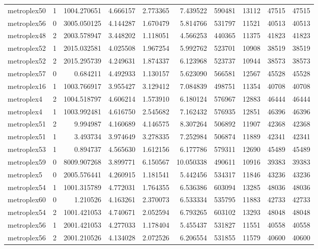 \begin{longtable}{|l|r|r|r|r|r|r|r|r|r|}
metroplex50 & 1 & 1004.270651 & 4.666157 & 2.773365 & 7.439522 & 590481 & 13112 & 47515 & 47515 \\
metroplex56 & 0 & 3005.050125 & 4.144287 & 1.670479 & 5.814766 & 531797 & 11521 & 40513 & 40513 \\
metroplex48 & 2 & 2003.578947 & 3.448202 & 1.118051 & 4.566253 & 440365 & 11375 & 41823 & 41823 \\
metroplex52 & 1 & 2015.032581 & 4.025508 & 1.967254 & 5.992762 & 523701 & 10908 & 38519 & 38519 \\
metroplex52 & 2 & 2015.295739 & 4.249631 & 1.874337 & 6.123968 & 523737 & 10944 & 38573 & 38573 \\
metroplex57 & 0 & 0.684211 & 4.492933 & 1.130157 & 5.623090 & 566581 & 12567 & 45528 & 45528 \\
metroplex16 & 1 & 1003.766917 & 3.955427 & 3.129412 & 7.084839 & 498751 & 11354 & 40708 & 40708 \\
metroplex4 & 2 & 1004.518797 & 4.606214 & 1.573910 & 6.180124 & 576967 & 12883 & 46444 & 46444 \\
metroplex4 & 1 & 1003.992481 & 4.616750 & 2.545682 & 7.162432 & 576935 & 12851 & 46396 & 46396 \\
metroplex51 & 2 & 9.994987 & 4.160689 & 4.146575 & 8.307264 & 506892 & 11907 & 42368 & 42368 \\
metroplex51 & 1 & 3.493734 & 3.974649 & 3.278335 & 7.252984 & 506874 & 11889 & 42341 & 42341 \\
metroplex53 & 1 & 0.894737 & 4.565630 & 1.612156 & 6.177786 & 579311 & 12690 & 45489 & 45489 \\
metroplex59 & 0 & 8009.907268 & 3.899771 & 6.150567 & 10.050338 & 490611 & 10916 & 39383 & 39383 \\
metroplex5 & 0 & 2005.576441 & 4.260915 & 1.181541 & 5.442456 & 534317 & 11846 & 43236 & 43236 \\
metroplex54 & 1 & 1001.315789 & 4.772031 & 1.764355 & 6.536386 & 603094 & 13285 & 48036 & 48036 \\
metroplex60 & 0 & 1.210526 & 4.163261 & 2.370073 & 6.533334 & 535795 & 11883 & 42733 & 42733 \\
metroplex54 & 2 & 1001.421053 & 4.740671 & 2.052594 & 6.793265 & 603102 & 13293 & 48048 & 48048 \\
metroplex56 & 1 & 2001.421053 & 4.277033 & 1.178404 & 5.455437 & 531827 & 11551 & 40558 & 40558 \\
metroplex56 & 2 & 2001.210526 & 4.134028 & 2.072526 & 6.206554 & 531855 & 11579 & 40600 & 40600 \\

\end{longtable}
